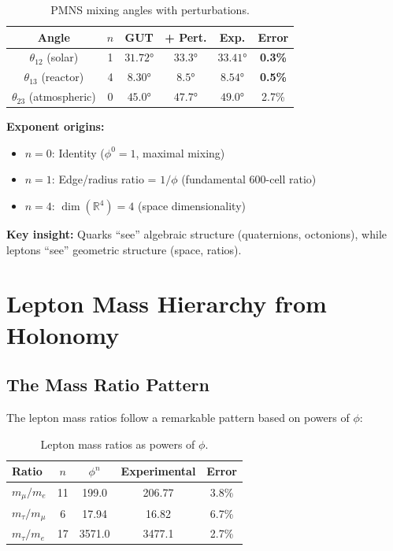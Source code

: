 \documentclass[12pt,a4paper]{article}
\begin{document}
\begin{table}[H]
\centering
\begin{tabular}{cccccc}
\toprule
\textbf{Angle} & \textbf{$n$} & \textbf{GUT} & \textbf{+ Pert.} & \textbf{Exp.} & \textbf{Error} \\
\midrule
$\theta_{12}$ (solar) & 1 & $31.72°$ & $33.3°$ & $33.41°$ & \textbf{0.3\%} \\
$\theta_{13}$ (reactor) & 4 & $8.30°$ & $8.5°$ & $8.54°$ & \textbf{0.5\%} \\
$\theta_{23}$ (atmospheric) & 0 & $45.0°$ & $47.7°$ & $49.0°$ & 2.7\% \\
\bottomrule
\end{tabular}
\caption{PMNS mixing angles with perturbations.}
\end{table}

\textbf{Exponent origins:}
\begin{itemize}
    \item $n=0$: Identity ($\phi^0 = 1$, maximal mixing)
    \item $n=1$: Edge/radius ratio = $1/\phi$ (fundamental 600-cell ratio)
    \item $n=4$: $\dim(\mathbb{R}^4) = 4$ (space dimensionality)
\end{itemize}

\textbf{Key insight:} Quarks ``see'' algebraic structure (quaternions, octonions), while leptons ``see'' geometric structure (space, ratios).

\section{Lepton Mass Hierarchy from Holonomy}

\subsection{The Mass Ratio Pattern}

The lepton mass ratios follow a remarkable pattern based on powers of $\phi$:

\begin{table}[H]
\centering
\begin{tabular}{lcccc}
\toprule
\textbf{Ratio} & \textbf{$n$} & \textbf{$\phi^n$} & \textbf{Experimental} & \textbf{Error} \\
\midrule
$m_\mu/m_e$ & 11 & 199.0 & 206.77 & 3.8\% \\
$m_\tau/m_\mu$ & 6 & 17.94 & 16.82 & 6.7\% \\
$m_\tau/m_e$ & 17 & 3571.0 & 3477.1 & 2.7\% \\
\bottomrule
\end{tabular}
\caption{Lepton mass ratios as powers of $\phi$.}
\end{table}
\end{document}
